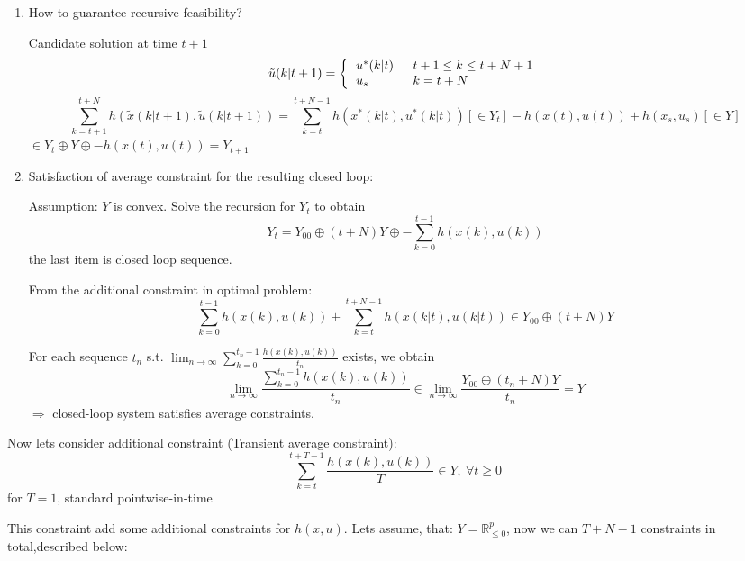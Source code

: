 \begin{enumerate}
\item How to guarantee recursive feasibility?

Candidate solution at time $t+1$ 
\begin{equation*}
\tilde{u}(k|t+1) = \left \{
  \begin{tabular}{ll}
  $u^*(k|t)$ & $\ t+1 \leq k \leq t+N+1$ \\
  $u_s$ & $\ k = t + N$
  \end{tabular}
\right .
\end{equation*}
\begin{equation*}
\sum_{k=t+1}^{t+N}h(\tilde{x}(k|t+1), \tilde{u}(k|t+1)) = \sum_{k=t}^{t+N-1}h(x^*(k|t), u^*(k|t))[\in Y_t] - h(x(t),u(t)) + h(x_s,u_s)[\in Y]
\end{equation*}
$\in Y_t \oplus Y \oplus {-h(x(t),u(t))} = Y_{t+1}$
\item Satisfaction of average constraint for the resulting closed loop:

Assumption: $Y$ is convex. Solve the recursion for $Y_t$ to obtain 
\begin{equation*}
Y_t = Y_{00} \oplus (t+N)Y \oplus {- \sum_{k=0}^{t-1}h(x(k),u(k))}
\end{equation*}
the last item is closed loop sequence.

From the additional constraint in optimal problem:
\begin{equation*}
\sum_{k=0}^{t-1}h(x(k),u(k)) + \sum_{k=t}^{t+N-1}h(x(k|t), u(k|t)) \in Y_{00} \oplus (t+N)Y
\end{equation*}

For each sequence {$t_n$} s.t. $\lim_{n \to \infty} \sum_{k=0}^{t_n -1}\frac{h(x(k),u(k))}{t_n} $ exists, we obtain 
\begin{equation*}
\lim_{n \to \infty} \frac{\sum_{k=0}^{t_n-1}h(x(k),u(k))}{t_n} \in \lim_{n \to \infty} \frac{Y_{00} \oplus (t_n + N)Y}{t_n} = Y
\end{equation*}
$\Rightarrow$ closed-loop system satisfies average constraints.
\end{enumerate}

Now lets consider additional constraint (Transient average constraint):
\begin{equation*}
\sum_{k=t}^{t+T-1}\frac{h(x(k),u(k))}{T} \in Y, \ \forall t \geq 0
\end{equation*}
for $T=1$, standard pointwise-in-time 

This constraint add some additional constraints for $h(x,u)$. Lets assume, that: $Y= \mathbb{R}^p_{\leq 0}$, now we can 
$T+N-1$ constraints in total,described below:

